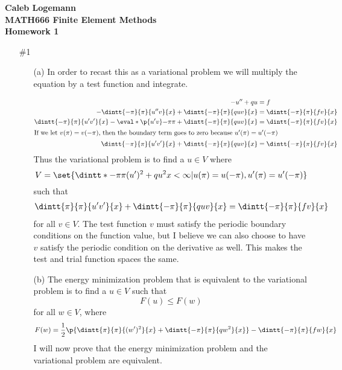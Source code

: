 \documentclass[11pt, oneside]{article}
\begin{document}
\noindent \textbf{\Large{Caleb Logemann \\
MATH666 Finite Element Methods \\
Homework 1
}}
\pagebreak

%
\begin{enumerate}
  \item[\#1]
    \begin{enumerate}
    \item[(a)] %
      In order to recast this as a variational problem we will multiply the
      equation by a test function and integrate.

      \begin{align*}
        -u'' + q u &= f \\
        -\dintt{-\pi}{\pi}{u''v}{x} + \dintt{-\pi}{\pi}{quv}{x} &= \dintt{-\pi}{\pi}{fv}{x}\\
        \dintt{-\pi}{\pi}{u'v'}{x} - \eval*{\p{u'v}}{-\pi}{\pi}+ \dintt{-\pi}{\pi}{quv}{x} &= \dintt{-\pi}{\pi}{fv}{x} \\
        \intertext{If we let $v(\pi) = v(-\pi)$, then the boundary term goes to zero because $u'(\pi) = u'(-\pi)$}
        \dintt{-\pi}{\pi}{u'v'}{x} + \dintt{-\pi}{\pi}{quv}{x} &= \dintt{-\pi}{\pi}{fv}{x}
      \end{align*}
      Thus the variational problem is to find a $u \in V$ where
      \[
        V = \set{\dintt*{-\pi}{\pi}{(u')^2 + qu^2}{x} < \infty | u(\pi) = u(-\pi), u'(\pi) = u'(-\pi)}
      \]
      such that
      \begin{align*}
        \dintt{\pi}{\pi}{u'v'}{x} + \dintt{-\pi}{\pi}{quv}{x} &= \dintt{-\pi}{\pi}{fv}{x}
      \end{align*}
      for all $v \in V$.
      The test function $v$ must satisfy the periodic boundary conditions on the
      function value, but I believe we can also choose to have $v$ satisfy the
      periodic condition on the derivative as well.
      This makes the test and trial function spaces the same.

    \item[(b)] %
      The energy minimization problem that is equivalent to the variational
      problem is to find a $u \in V$ such that
      \[
        F(u) \le F(w)
      \]
      for all $w \in V$, where
      \[
        F(w) = \frac{1}{2}\p{\dintt{\pi}{\pi}{(w')^2}{x} + \dintt{-\pi}{\pi}{qw^2}{x}} - \dintt{-\pi}{\pi}{fw}{x}
      \]
      I will now prove that the energy minimization problem and the variational
      problem are equivalent.


\end{enumerate}
\end{enumerate}
\end{document}
